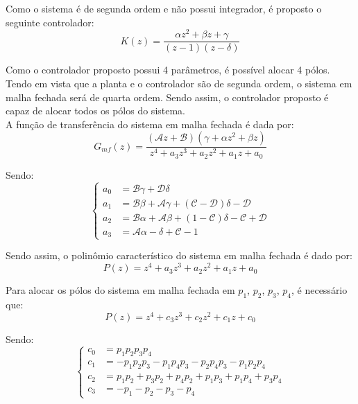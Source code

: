 \documentclass[]{politex}
\begin{document}
Como o sistema é de segunda ordem e não possui integrador, é proposto o seguinte controlador:
\begin{equation}
K(z) = \frac{\alpha z^2 + \beta z + \gamma}{(z-1)(z-\delta)}
\end{equation}

Como o controlador proposto possui 4 parâmetros, é possível alocar 4 pólos. Tendo em vista que a planta e o controlador são de segunda ordem, o sistema em malha fechada será de quarta ordem. Sendo assim, o controlador proposto é capaz de alocar todos os pólos do sistema. \\

A função de transferência do sistema em malha fechada é dada por:
\begin{equation}
G_{mf}(z) = \frac{(\mathcal{A} z+\mathcal{B}) \left(\gamma +\alpha  z^2+\beta  z\right)}{z^4 + a_3 z^3 + a_2 z^2 + a_1 z + a_0}
\end{equation}

Sendo:
\begin{equation}
\begin{cases}
a_0 &=  \mathcal{B} \gamma  + \mathcal{D} \delta\\
a_1 &= \mathcal{B} \beta + \mathcal{A} \gamma +(\mathcal{C}  -  \mathcal{D}) \delta -\mathcal{D}   \\
a_2 &= \mathcal{B} \alpha + \mathcal{A} \beta + (1 -\mathcal{C}) \delta -\mathcal{C} +\mathcal{D}  \\
a_3 &=   \mathcal{A} \alpha -\delta +\mathcal{C} -1
\end{cases}
\end{equation}



Sendo assim, o polinômio característico do sistema em malha fechada é dado por:
\begin{equation}
P(z) = z^4 + a_3 z^3 + a_2 z^2 + a_1 z + a_0
\end{equation}

Para alocar os pólos do sistema em malha fechada em $p_1$, $p_2$, $p_3$, $p_4$, é necessário que:
\begin{equation}
P(z) = z^4 + c_3 z^3 + c_2 z^2 + c_1 z + c_0
\end{equation}

Sendo:
\begin{equation}
\begin{cases}
c_0 &= p_1 p_2 p_3 p_4 \\
c_1 &= -p_1 p_2 p_3-p_1 p_4 p_3-p_2 p_4 p_3-p_1 p_2 p_4 \\
c_2 &= p_1 p_2+p_3 p_2+p_4 p_2+p_1 p_3+p_1 p_4+p_3 p_4 \\
c_3 &= -p_1-p_2-p_3-p_4
\end{cases}
\end{equation}
\end{document}
